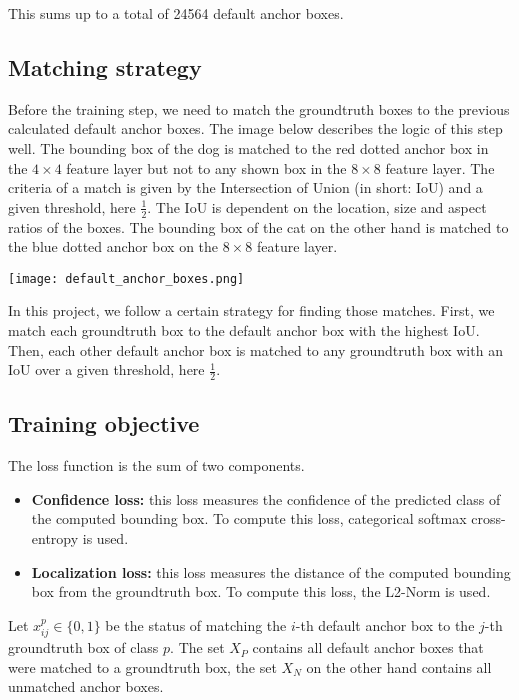 This sums up to a total of 24564 default anchor boxes.

\subsection{Matching strategy}

Before the training step, we need to match the groundtruth boxes to the previous calculated default anchor boxes. The image below describes the logic of this step well. The bounding box of the dog is matched to the red dotted anchor box in the $4 \times 4$ feature layer but not to any shown box in the $8 \times 8$ feature layer. The criteria of a match is given by the Intersection of Union (in short: IoU) and a given threshold, here $\frac{1}{2}$. The IoU is dependent on the location, size and aspect ratios of the boxes. The bounding box of the cat on the other hand is matched to the blue dotted anchor box on the $8 \times 8$ feature layer.

\begin{center}
  \texttt{[image: default\_anchor\_boxes.png]}
\end{center}

In this project, we follow a certain strategy for finding those matches. First, we match each groundtruth box to the default anchor box with the highest IoU. Then, each other default anchor box is matched to any groundtruth box with an IoU over a given threshold, here $\frac{1}{2}$.

\subsection{Training objective}

The loss function is the sum of two components.

\begin{itemize}
  \item \textbf{Confidence loss:} this loss measures the confidence of the predicted class of the computed bounding box. To compute this loss, categorical softmax cross-entropy is used.
  \item \textbf{Localization loss:} this loss measures the distance of the computed bounding box from the groundtruth box. To compute this loss, the L2-Norm is used.
\end{itemize}

Let $x_{ij}^p \in \{0, 1\}$ be the status of matching the $i$-th default anchor box to the $j$-th groundtruth box of class $p$. The set $X_P$ contains all default anchor boxes that were matched to a groundtruth box, the set $X_N$ on the other hand contains all unmatched anchor boxes. \\

